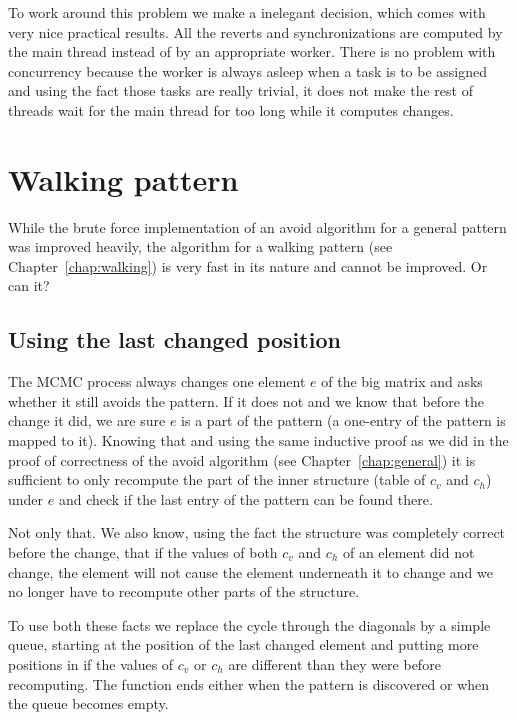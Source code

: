 To work around this problem we make a inelegant decision, which comes with very nice practical results. All the reverts and synchronizations are computed by the main thread instead of by an appropriate worker. There is no problem with concurrency because the worker is always asleep when a task is to be assigned and using the fact those tasks are really trivial, it does not make the rest of threads wait for the main thread for too long while it computes changes.

\section{Walking pattern}
While the brute force implementation of an avoid algorithm for a general pattern was improved heavily, the algorithm for a walking pattern (see Chapter~\ref{chap:walking}) is very fast in its nature and cannot be improved. Or can it?

\subsection{Using the last changed position}
The MCMC process always changes one element $e$ of the big matrix and asks whether it still avoids the pattern. If it does not and we know that before the change it did, we are sure $e$ is a part of the pattern (a one-entry of the pattern is mapped to it). Knowing that and using the same inductive proof as we did in the proof of correctness of the avoid algorithm (see Chapter~\ref{chap:general}) it is sufficient to only recompute the part of the inner structure (table of $c_v$ and $c_h$) under $e$ and check if the last entry of the pattern can be found there.

Not only that. We also know, using the fact the structure was completely correct before the change, that if the values of both $c_v$ and $c_h$ of an element did not change, the element will not cause the element underneath it to change and we no longer have to recompute other parts of the structure.

To use both these facts we replace the cycle through the diagonals by a simple queue, starting at the position of the last changed element and putting more positions in if the values of $c_v$ or $c_h$ are different than they were before recomputing. The function ends either when the pattern is discovered or when the queue becomes empty.

